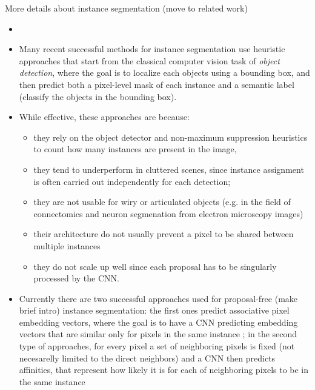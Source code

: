 More details about instance segmentation (move to related work)
\begin{itemize}


\item 
\item Many recent successful methods for instance segmentation %
 use heuristic approaches that start from the classical computer vision task of \emph{object detection}, where the goal is to localize each objects using a bounding box, and then predict both a pixel-level mask of each instance and a semantic label (classify the objects in the bounding box).  \cite{yang2012layered,ladicky2010and,hariharan2014simultaneous,chen2015multi,dai2016instance,liang2016reversible,he2017mask}
\item While effective, these approaches are  because:
\begin{itemize}
\item they rely on the object detector and non-maximum suppression heuristics to count how many instances are present in the image, 
\item they tend to underperform in cluttered scenes, since instance assignment is often carried out independently for each detection; 
\item they are not usable for wiry or articulated objects (e.g. in the field of connectomics and neuron segmenation from electron microscopy images) 
\item their architecture do not usually prevent a pixel to be shared between multiple instances
\item they do not scale up well since each proposal has to be singularly processed by the CNN. 
\end{itemize}

\item Currently there are two successful approaches used for proposal-free (make brief intro) instance segmentation: the first ones predict associative pixel embedding vectors, where the goal is to have a CNN predicting embedding vectors that are similar only for pixels in the same instance \cite{kong2018recurrent,fathi2017semantic,newell2017associative,de2017semantic}; in the second type of approaches, for every pixel a set of neighboring pixels is fixed  (not necesarelly limited to the direct neighbors) and a CNN then predicts affinities, that represent how likely it is for each of neighboring pixels to be in the same instance \cite{liu2018affinity,wolf2018mutex,xie2015holistically}


\end{itemize}
